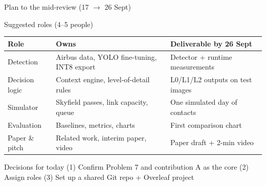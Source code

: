 \documentclass[aspectratio=169,10pt]{beamer}
\begin{document}
\begin{frame}{Plan to the mid-review (17 $\rightarrow$ 26 Sept)}
\centering
{}
\end{frame}

\begin{frame}{Suggested roles (4--5 people)}
\footnotesize
\renewcommand{\arraystretch}{1.15}
\begin{tabularx}{\textwidth}{@{}l L L@{}}
\toprule
\textbf{Role} & \textbf{Owns} & \textbf{Deliverable by 26 Sept} \\
\midrule
Detection & Airbus data, YOLO fine-tuning, INT8 export & Detector + runtime measurements \\
Decision logic & Context engine, level-of-detail rules & L0/L1/L2 outputs on test images \\
Simulator & Skyfield passes, link capacity, queue & One simulated day of contacts \\
Evaluation & Baselines, metrics, charts & First comparison chart \\
Paper \& pitch & Related work, interim paper, video & Paper draft + 2-min video \\
\bottomrule
\end{tabularx}
\vspace{2mm}
\begin{alertblock}{Decisions for today}
\footnotesize (1) Confirm Problem 7 and contribution A as the core \quad (2) Assign roles \quad (3) Set up a shared Git repo + Overleaf project
\end{alertblock}
\end{frame}
\end{document}
